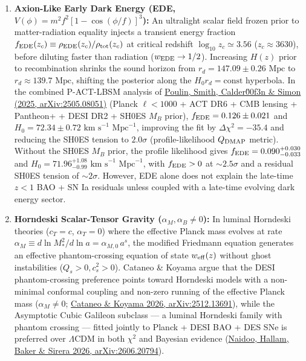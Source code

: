 \documentclass[aps,prd,preprint,superscriptaddress,nofootinbib]{revtex4-2}
\begin{document}
\begin{enumerate}
    \setlength{\itemsep}{3pt}
    \item \textbf{Axion-Like Early Dark Energy (EDE, $V(\phi) = m^2 f^2 [1 - \cos(\phi/f)]^3$):} An ultralight scalar field frozen prior to matter-radiation equality injects a transient energy fraction $f_{\rm EDE}(z_c) \equiv \rho_{\rm EDE}(z_c)/\rho_{\rm tot}(z_c)$ at critical redshift $\log_{10} z_c \simeq 3.56$ ($z_c \approx 3630$), before diluting faster than radiation ($w_{\rm EDE} \to 1/2$). Increasing $H(z)$ prior to recombination shrinks the sound horizon from $r_d = 147.09 \pm 0.26\text{ Mpc}$ to $r_d \approx 139.7\text{ Mpc}$, shifting the posterior along the $H_0 r_d = \text{const}$ hyperbola. In the combined P-ACT-LBSM analysis of \href{https://arxiv.org/abs/2505.08051}{Poulin, Smith, Calder\u00f3n \& Simon (2025, arXiv:2505.08051)} (Planck $\ell < 1000$ + ACT DR6 + CMB lensing + Pantheon+ + DESI DR2 + SH0ES $M_B$ prior), $f_{\rm EDE} = 0.126 \pm 0.021$ and $H_0 = 72.34 \pm 0.72\text{ km s}^{-1}\text{ Mpc}^{-1}$, improving the fit by $\Delta\chi^2 = -35.4$ and reducing the SH0ES tension to $2.0\sigma$ (profile-likelihood $Q_{\rm DMAP}$ metric). Without the SH0ES $M_B$ prior, the profile likelihood gives $f_{\rm EDE} = 0.090^{+0.030}_{-0.033}$ and $H_0 = 71.96^{+1.08}_{-0.99}\text{ km s}^{-1}\text{ Mpc}^{-1}$, with $f_{\rm EDE} > 0$ at $\sim 2.5\sigma$ and a residual SH0ES tension of $\sim 2\sigma$. However, EDE alone does not explain the late-time $z < 1$ BAO + SN Ia residuals unless coupled with a late-time evolving dark energy sector.
    \item \textbf{Horndeski Scalar-Tensor Gravity ($\alpha_M, \alpha_B \neq 0$):} In luminal Horndeski theories ($c_T = c$, $\alpha_T = 0$) where the effective Planck mass evolves at rate $\alpha_M \equiv d\ln M_*^2 / d\ln a = \alpha_{M,0}\, a^s$, the modified Friedmann equation generates an effective phantom-crossing equation of state $w_{\rm eff}(z)$ without ghost instabilities ($Q_s > 0, c_s^2 > 0$). Cataneo \& Koyama argue that the DESI phantom-crossing preference points toward Horndeski models with a non-minimal conformal coupling and non-zero running of the effective Planck mass ($\alpha_M \neq 0$; \href{https://arxiv.org/abs/2512.13691}{Cataneo \& Koyama 2026, arXiv:2512.13691}), while the Asymptotic Cubic Galileon subclass --- a luminal Horndeski family with phantom crossing --- fitted jointly to Planck + DESI BAO + DES SNe is preferred over $\Lambda$CDM in both $\chi^2$ and Bayesian evidence (\href{https://arxiv.org/abs/2606.20794}{Naidoo, Hallam, Baker \& Sirera 2026, arXiv:2606.20794}).

\end{enumerate}
\end{document}
